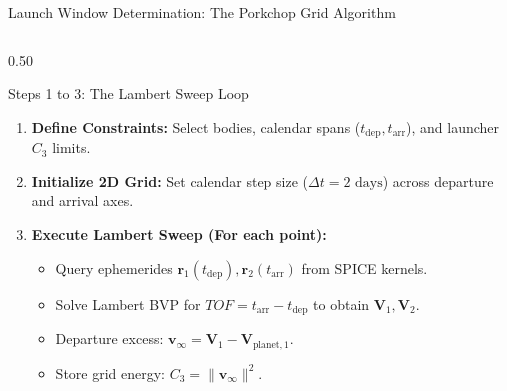 \documentclass[aspectratio=169, 10pt]{beamer}
\begin{document}
\begin{frame}{Launch Window Determination: The Porkchop Grid Algorithm}
    \begin{columns}[t]
        \begin{column}{0.50\textwidth}
            \begin{block}{Steps 1 to 3: The Lambert Sweep Loop}
                \scriptsize
                \begin{enumerate}\setlength{\itemsep}{1pt}\setlength{\topsep}{1pt}
                    \item \textbf{Define Constraints:} Select bodies, calendar spans ($t_{\text{dep}}, t_{\text{arr}}$), and launcher $C_3$ limits.
                    \item \textbf{Initialize 2D Grid:} Set calendar step size ($\Delta t = 2\text{ days}$) across departure and arrival axes.
                    \item \textbf{Execute Lambert Sweep (For each point):}
                    \begin{itemize}\setlength{\itemsep}{0.5pt}
                        \item Query ephemerides $\mathbf{r}_1(t_{\text{dep}}), \mathbf{r}_2(t_{\text{arr}})$ from SPICE kernels.
                        \item Solve Lambert BVP for $TOF = t_{\text{arr}} - t_{\text{dep}}$ to obtain $\mathbf{V}_1, \mathbf{V}_2$.
                        \item Departure excess: $\mathbf{v}_\infty = \mathbf{V}_1 - \mathbf{V}_{\text{planet},1}$.
                        \item Store grid energy: $C_3 = \|\mathbf{v}_\infty\|^2$.
                    \end{itemize}
                \end{enumerate}
            \end{block}
        \end{column}


\end{columns}
\end{frame}
\end{document}
